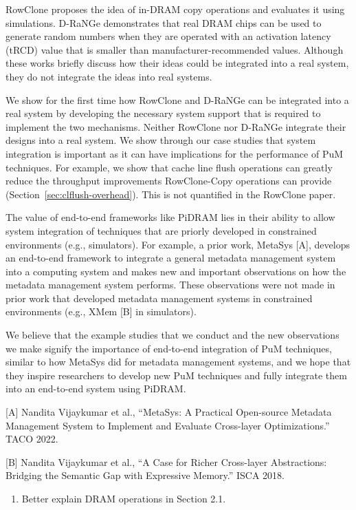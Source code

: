 RowClone proposes the idea of in-DRAM copy operations and evaluates it using simulations. D-RaNGe demonstrates that real DRAM chips can be used to generate random numbers when they are operated with an activation latency (tRCD) value that is smaller than manufacturer-recommended values. Although these works briefly discuss how their ideas could be integrated into a real system, they do not integrate the ideas into real systems.

We show for the first time how RowClone and D-RaNGe can be integrated into a real system by developing the necessary system support that is required to implement the two mechanisms. Neither RowClone nor D-RaNGe integrate their designs into a real system. We show through our case studies that system integration is important as it can have implications for the performance of PuM techniques. For example, we show that cache line flush operations can greatly reduce the throughput improvements RowClone-Copy operations can provide (Section~\ref{sec:clflush-overhead}). This is not quantified in the RowClone paper.

The value of end-to-end frameworks like PiDRAM lies in their ability to allow system integration of techniques that are priorly developed in constrained environments (e.g., simulators). For example, a prior work, MetaSys [A], develops an end-to-end framework to integrate a general metadata management system into a computing system and makes new and important observations on how the metadata management system performs. These observations were not made in prior work that developed metadata management systems in constrained environments (e.g., XMem [B] in simulators).

We believe that the example studies that we conduct and the new observations we make signify the importance of end-to-end integration of PuM techniques, similar to how MetaSys did for metadata management systems, and we hope that they inspire researchers to develop new PuM techniques and fully integrate them into an end-to-end system using PiDRAM.

[A] Nandita Vijaykumar et al., ``MetaSys: A Practical Open-source Metadata Management System to Implement and Evaluate Cross-layer Optimizations.'' TACO 2022.

[B] Nandita Vijaykumar et al., ``A Case for Richer Cross-layer Abstractions: Bridging the Semantic Gap with Expressive Memory.'' ISCA 2018.


\bigbreak
\begin{tcolorbox}
    \begin{enumerate}[label=R4/\arabic*]
        \addtocounter{enumi}{5}
        \item \label{q:r4q6} Better explain DRAM operations in Section 2.1.
    \end{enumerate}
\end{tcolorbox} 

